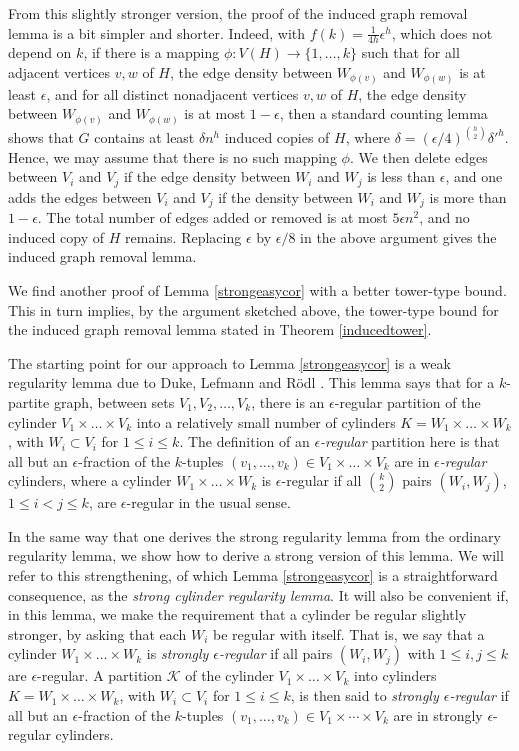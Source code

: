\documentclass[11pt]{article}
\begin{document}
From this slightly stronger version, the proof of the induced graph removal
lemma is a bit simpler and shorter.  Indeed, with $f(k)=\frac{1}{4h}\epsilon^h$, which
does not depend on $k$, if there is a mapping
$\phi:V(H) \rightarrow \{1,\ldots,k\}$ such that for all adjacent vertices
$v,w$ of $H$, the edge density between $W_{\phi(v)}$ and $W_{\phi(w)}$ is at
least $\epsilon$, and for all distinct nonadjacent vertices $v,w$ of $H$, the
edge density between $W_{\phi(v)}$ and $W_{\phi(w)}$ is at most $1-\epsilon$,
then a standard counting lemma shows that $G$ contains at least $\delta n^h$
induced copies of $H$, where $\delta=(\epsilon/4)^{{h \choose 2}}\delta'^h$. Hence, we may
assume that there is no such mapping $\phi$.
We then delete edges between $V_i$ and $V_j$ if the edge density between $W_i$
and $W_j$ is less than $\epsilon$, and one adds the edges between $V_i$ and
$V_j$ if the density between $W_i$ and $W_j$ is more than $1-\epsilon$. The
total number of edges added or removed is at most $5\epsilon n^2$, and no
induced copy of $H$ remains. Replacing $\epsilon$ by $\epsilon/8$ in the above argument gives the induced graph removal lemma. 

We find another proof of Lemma \ref{strongeasycor} with a better tower-type
bound. This in turn implies, by the argument sketched above, the tower-type bound for the induced graph removal lemma stated in Theorem \ref{inducedtower}. 

The starting point for our approach to Lemma \ref{strongeasycor} is a weak regularity lemma due to Duke, Lefmann and
R\"odl \cite{DLR}. This lemma says that for a $k$-partite graph, between sets
$V_1, V_2, \dots, V_k$, there is an $\epsilon$-regular partition of the
cylinder $V_1 \times \dots \times V_k$ into a relatively small number of cylinders $K = W_1 \times \dots
\times W_k$, with $W_i \subset V_i$ for $1 \leq i \leq k$. The definition of an
{\it $\epsilon$-regular} partition here is that all but an $\epsilon$-fraction
of the $k$-tuples $(v_1, \dots, v_k) \in V_1 \times \dots \times V_k$ are in
{\it $\epsilon$-regular} cylinders, where a cylinder $W_1 \times \dots \times
W_k$ is $\epsilon$-regular if all $\binom{k}{2}$ pairs $(W_i, W_j)$, $1 \leq i
< j \leq k$, are $\epsilon$-regular in the usual sense.

In the same way that one derives the strong regularity lemma from the ordinary
regularity lemma, we show how to derive a strong version of this lemma. We will
refer to this strengthening, of which Lemma \ref{strongeasycor} is a
straightforward consequence, as the  {\it strong cylinder regularity lemma}. It
will also be convenient if, in this lemma, we make the requirement that a
cylinder be regular slightly stronger, by asking that each $W_i$ be regular
with itself. That is, we say that a cylinder $W_1 \times \dots \times W_k$ is
{\it strongly $\epsilon$-regular} if all pairs  $(W_i,W_j)$ with $1 \leq i,j
\leq k$ are $\epsilon$-regular. A partition $\mathcal{K}$ of the cylinder $V_1
\times \dots \times V_k$ into cylinders $K = W_1 \times \dots \times W_k$, with
$W_i \subset V_i$ for $1 \leq i \leq k$, is then said to {\it strongly
$\epsilon$-regular} if all but an $\epsilon$-fraction of the $k$-tuples
$(v_1,\ldots,v_k) \in V_1 \times \cdots \times V_k$ are in strongly
$\epsilon$-regular cylinders.
\end{document}
